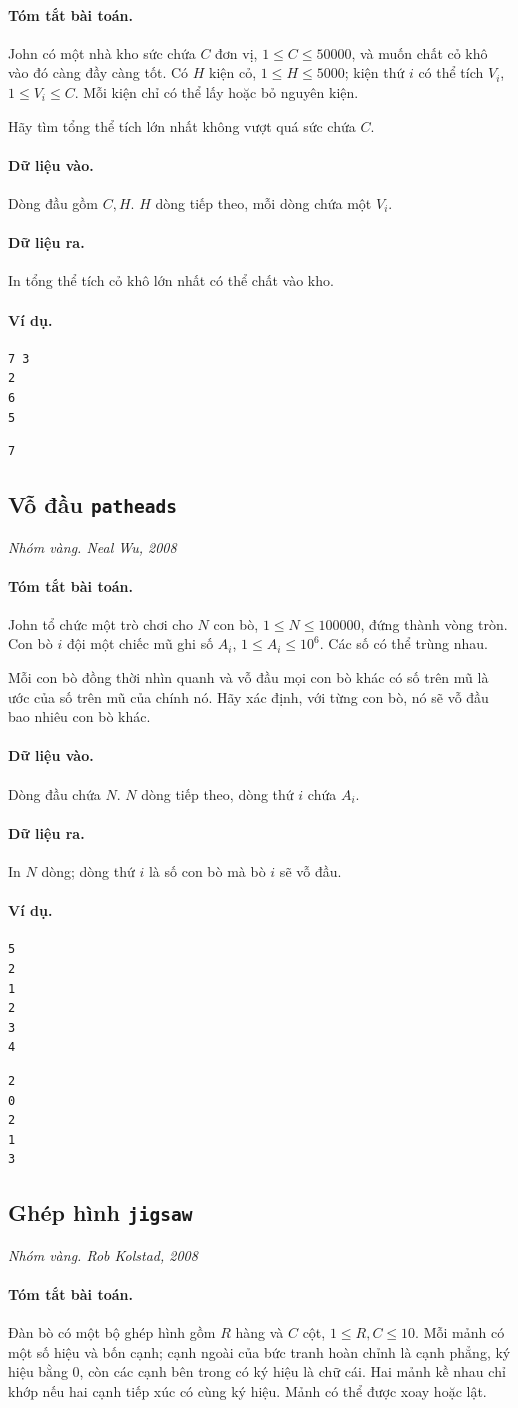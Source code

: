 \documentclass[11pt]{article}
\newcommand{\problem}[4]{%
  \subsection[#1 (#2)]{#1 \hfill {\normalsize\texttt{#2}}}%
  \noindent\textit{#3. #4}\par\smallskip
}
\newcommand{\iosec}[1]{\paragraph{#1}}
\begin{document}
\iosec{Tóm tắt bài toán.}
John có một nhà kho sức chứa \(C\) đơn vị, \(1\le C\le 50000\), và muốn chất
cỏ khô vào đó càng đầy càng tốt. Có \(H\) kiện cỏ, \(1\le H\le 5000\); kiện
thứ \(i\) có thể tích \(V_i\), \(1\le V_i\le C\). Mỗi kiện chỉ có thể lấy
hoặc bỏ nguyên kiện.

Hãy tìm tổng thể tích lớn nhất không vượt quá sức chứa \(C\).

\iosec{Dữ liệu vào.}
Dòng đầu gồm \(C,H\). \(H\) dòng tiếp theo, mỗi dòng chứa một \(V_i\).

\iosec{Dữ liệu ra.}
In tổng thể tích cỏ khô lớn nhất có thể chất vào kho.

\iosec{Ví dụ.}
\begin{verbatim}
7 3
2
6
5
\end{verbatim}

\begin{verbatim}
7
\end{verbatim}

\problem{Vỗ đầu}{patheads}{Nhóm vàng}{Neal Wu, 2008}

\iosec{Tóm tắt bài toán.}
John tổ chức một trò chơi cho \(N\) con bò, \(1\le N\le 100000\), đứng thành
vòng tròn. Con bò \(i\) đội một chiếc mũ ghi số \(A_i\), \(1\le A_i\le
10^6\). Các số có thể trùng nhau.

Mỗi con bò đồng thời nhìn quanh và vỗ đầu mọi con bò khác có số trên mũ là
ước của số trên mũ của chính nó. Hãy xác định, với từng con bò, nó sẽ vỗ đầu
bao nhiêu con bò khác.

\iosec{Dữ liệu vào.}
Dòng đầu chứa \(N\). \(N\) dòng tiếp theo, dòng thứ \(i\) chứa \(A_i\).

\iosec{Dữ liệu ra.}
In \(N\) dòng; dòng thứ \(i\) là số con bò mà bò \(i\) sẽ vỗ đầu.

\iosec{Ví dụ.}
\begin{verbatim}
5
2
1
2
3
4
\end{verbatim}

\begin{verbatim}
2
0
2
1
3
\end{verbatim}

\problem{Ghép hình}{jigsaw}{Nhóm vàng}{Rob Kolstad, 2008}

\iosec{Tóm tắt bài toán.}
Đàn bò có một bộ ghép hình gồm \(R\) hàng và \(C\) cột,
\(1\le R,C\le 10\). Mỗi mảnh có một số hiệu và bốn cạnh; cạnh ngoài của bức
tranh hoàn chỉnh là cạnh phẳng, ký hiệu bằng \(0\), còn các cạnh bên trong có
ký hiệu là chữ cái. Hai mảnh kề nhau chỉ khớp nếu hai cạnh tiếp xúc có cùng
ký hiệu. Mảnh có thể được xoay hoặc lật.
\end{document}

